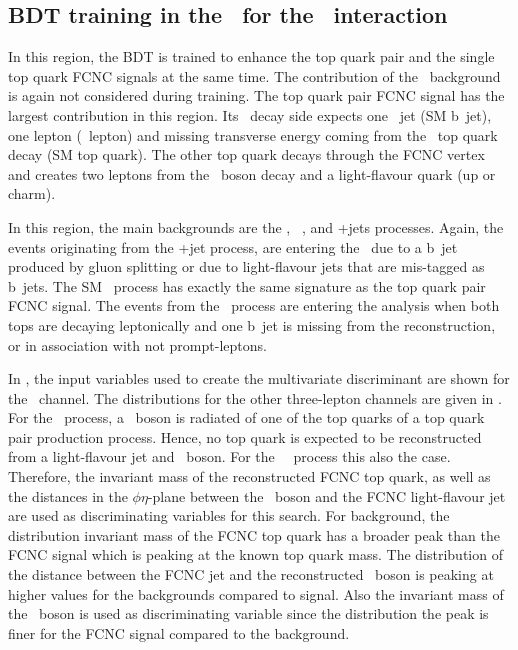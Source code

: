 \clearpage
\subsection{BDT training in the \TTSR\ for the \Zut\ interaction}
\label{sec:BDTTTSRZUT}
In this region, the BDT is trained to enhance the top quark pair and the single top quark FCNC signals at the same time. The contribution of the \NPL\ background is again not considered during training. The top quark pair FCNC signal has the largest contribution in this region. Its \SM\ decay side expects one \Pbottom\ jet (SM b~jet), one lepton (\PW\ lepton) and missing transverse energy coming from the \SM\ top quark decay (SM top quark). The other top quark decays through the FCNC vertex and creates two leptons from the \PZ\ boson decay and a light-flavour quark (up or charm). 

In this region, the main backgrounds are the \ttZ, \SM\ \tZq, and \WZ+jets processes. Again, the events originating from the \WZ+jet process, are entering the \STSR\ due to a b~jet produced by gluon splitting or due to light-flavour jets that are mis-tagged as b~jets.  The SM \tZq\ process has exactly the same signature as the top quark pair FCNC signal.  The events from the \ttZ\ process are entering the analysis when both tops are decaying leptonically and one b~jet is missing from the reconstruction, or in association with not prompt-leptons. 


  In , the input variables used to create the multivariate discriminant are shown for the \mumumu\ channel. The distributions for the other three-lepton channels are given in . For the \ttZ\ process, a \PZ\ boson is radiated of one of the top quarks of a top quark pair production process. Hence, no top quark is expected to be reconstructed from a light-flavour jet and \PZ\ boson. For the \SM\ \tZq\ process this also the case. Therefore, the invariant mass of the reconstructed FCNC top quark, as well as the distances in the $\phi\eta$-plane between the \PZ\ boson and the FCNC light-flavour jet are used as discriminating variables for this search. For background, the distribution invariant mass of the FCNC top quark has a broader peak than the FCNC signal which is peaking at the known top quark mass. The distribution of the distance between the FCNC jet and the reconstructed \PZ\ boson is peaking at higher values for the backgrounds compared to signal. Also the invariant mass of the \PZ\ boson is used as discriminating variable since the distribution the peak is finer for the FCNC signal compared to the background. 
  

